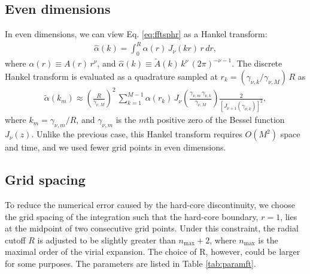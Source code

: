 \documentclass[aip,jcp,preprint,superscriptaddress,showpacs,preprintnumbers,amsmath,amssymb]{revtex4-1}
\numberwithin{equation}{section}
\begin{document}
\subsection{Even dimensions}





In even dimensions,
we can view Eq. \eqref{eq:fftsphr} as a Hankel transform:
%
%
%
\begin{align*}
  \hat \alpha(k)
=
  \int_0^R \alpha(r) \, J_\nu(k r) \, r \, dr,
\end{align*}
%
%
%
where
$\alpha(r) \equiv A(r) \, r^\nu$,
and
$\hat \alpha(k) \equiv \tilde A(k) \, k^\nu \, (2\pi)^{-\nu-1}$.
%
The discrete Hankel transform is
evaluated as a quadrature sampled at
$r_k = (\gamma_{\nu,k} / \gamma_{\nu,M}) \, R$\cite{
lado1967, johnson1987, *lemoine1994}
as
%
%
%
\begin{align*}
\tilde \alpha(k_m)
\approx
\left(
  \frac{ R }
  { \gamma_{\nu, M} }
\right)^2
\,
\sum_{k = 1}^{M - 1}
  \alpha(r_k) \,
  J_\nu\left(
    \frac{ \gamma_{\nu, m} \, \gamma_{\nu, k} }
         { \gamma_{\nu, M} }
  \right)
  \frac{ 2 }
       { \left[ J_{\nu+1}(\gamma_{\nu, k}) \right]^2 },
\end{align*}
%
%
%
where $k_m = \gamma_{\nu,m}/R$,
and $\gamma_{\nu, m}$ is the $m$th positive zero
of the Bessel function $J_\nu(z)$.
%
Unlike the previous case,
this Hankel transform requires $O(M^2)$ space and time,
and we used fewer grid points in even dimensions.





\subsection{Grid spacing}





To reduce the numerical error caused
by the hard-core discontinuity,
we choose the grid spacing of the integration such that
the hard-core boundary, $r = 1$, lies at the midpoint of two
consecutive grid points.
%
Under this constraint,
the radial cutoff $R$ is adjusted to be slightly greater than
$n_{\max} + 2$,
where $n_{\max}$ is the maximal order of the virial expansion.
%
The choice of R, however,
could be larger for some purposes.
%
The parameters are listed in Table \ref{tab:paramft}.
\end{document}
